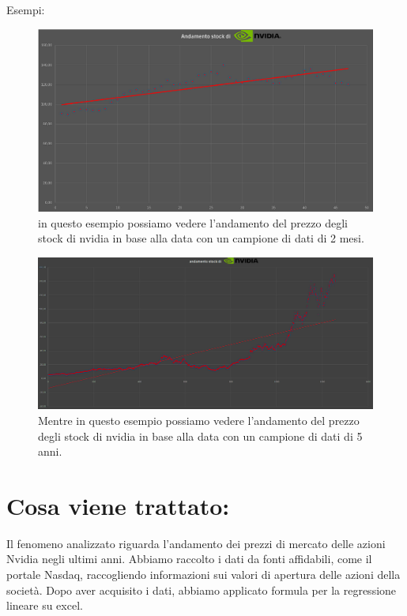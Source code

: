 \documentclass[11pt]{article}
\begin{document}
\begin{center}
    Esempi:\\

\begin{figure}[ht!]
    \centering
    \includegraphics[width=\textwidth]{immagini/Screenshot 2024-11-20 000800.png}
    \caption{in questo esempio possiamo vedere l'andamento del prezzo degli stock di nvidia in base alla data con un campione di dati di 2 mesi.}
\end{figure}
\begin{figure}[ht!]
    \centering
    \includegraphics[width=\textwidth]{immagini/Screenshot 2024-11-20 210756.png}
    \caption{Mentre in questo esempio possiamo vedere l'andamento del prezzo degli stock di nvidia in base alla data con un campione di dati di 5 anni.}
\end{figure}
\end{center}
\section*{Cosa viene trattato:}
Il fenomeno analizzato riguarda l'andamento dei prezzi di mercato delle azioni Nvidia negli ultimi anni. Abbiamo raccolto i dati da fonti affidabili, come il portale Nasdaq, 
raccogliendo informazioni sui valori di apertura delle azioni della società.
Dopo aver acquisito i dati, abbiamo applicato formula per la regressione lineare su excel.
\end{document}
